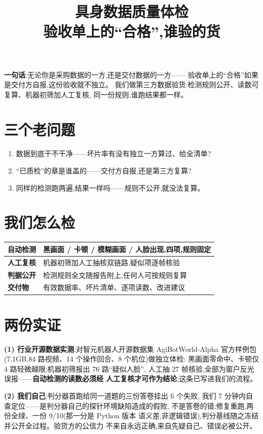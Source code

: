 \documentclass[10pt,a4paper]{ctexart}
\title{\vspace{-1.6em}\textcolor{acc}{具身数据质量体检}\\[0.2em]
\large 验收单上的“合格”,谁验的货}
\author{}
\date{}
\begin{document}
\maketitle
\vspace{-3.2em}

\noindent\textbf{一句话}:无论你是采购数据的一方,还是交付数据的一方——
验收单上的“合格”如果是交付方自报,这份验收就不独立。
我们做第三方数据验货:检测规则公开、读数可复算、机器初筛加人工复核,
同一份规则,谁跑结果都一样。

\section*{三个老问题}
\begin{enumerate}
\item 数据到底干不干净——坏片率有没有独立一方算过、给全清单?
\item “已质检”的章是谁盖的——交付方自报,还是第三方复算?
\item 同样的检测跑两遍,结果一样吗——规则不公开,就没法复算。
\end{enumerate}

\section*{我们怎么检}
\noindent
\begin{tabular}{@{}p{2.6cm}p{12.6cm}@{}}
\toprule
\textbf{自动检测} & 黑画面 / 卡顿 / 模糊画面 / 人脸出现,四项,规则固定 \\
\midrule
\textbf{人工复核} & 机器初筛加人工抽核双链路,疑似项逐帧核验 \\
\midrule
\textbf{判据公开} & 检测规则全文随报告附上,任何人可按规则复算 \\
\midrule
\textbf{交付物} & 有效数据率、坏片清单、逐项读数、改进建议 \\
\bottomrule
\end{tabular}

\section*{两份实证}
\textbf{(1) 行业开源数据实测}:对智元机器人开源数据集 AgiBotWorld-Alpha
官方样例包(7.1GB,84 路视频、14 个操作回合、8 个机位)做独立体检:
黑画面零命中、卡顿仅 4 路轻微越限;机器初筛报出 76 路“疑似人脸”,
人工抽 27 帧核验,全部为窗户反光误报——\textbf{自动检测的读数必须经
人工复核才可作为结论},这条已写进我们的流程。

\textbf{(2) 我们自己}:判分器首跑给同一道题的三份答卷挂出 6 个失败,
我们 7 分钟内自查定位——是判分器自己的探针环境缺陷造成的假败,
不是答卷的错;修复重跑,两份全绿、一份 9/10(那一分是 Python 版本
语义差,非逻辑错误),判分基线随之冻结并公开全过程。验货方的公信力
不来自永远正确,来自先疑自己、错误必被公开。
\end{document}
